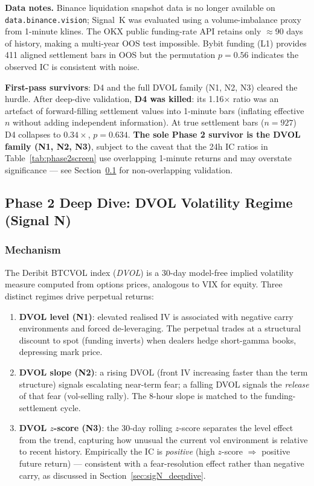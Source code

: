 \documentclass[12pt, a4paper]{article}
\theoremstyle{definition}
\begin{document}
\noindent \textbf{Data notes.}
Binance liquidation snapshot data is no longer available on
\texttt{data.binance.vision}; Signal~K was evaluated using a volume-imbalance
proxy from 1-minute klines.  The OKX public funding-rate API retains only
$\approx$90 days of history, making a multi-year OOS test impossible.
Bybit funding (L1) provides 411 aligned settlement bars in OOS but the
permutation $p = 0.56$ indicates the observed IC is consistent with noise.

\textbf{First-pass survivors}: D4 and the full DVOL family (N1, N2, N3)
cleared the hurdle.  After deep-dive validation, \textbf{D4 was killed}: its
1.16$\times$ ratio was an artefact of forward-filling settlement values into
1-minute bars (inflating effective $n$ without adding independent information).
At true settlement bars ($n = 927$) D4 collapses to $0.34\times$, $p = 0.634$.
\textbf{The sole Phase 2 survivor is the DVOL family (N1, N2, N3)}, subject to
the caveat that the 24h IC ratios in Table~\ref{tab:phase2screen} use overlapping
1-minute returns and may overstate significance --- see Section~\ref{sec:sigN}
for non-overlapping validation.

\subsection{Phase 2 Deep Dive: DVOL Volatility Regime (Signal N)}
\label{sec:sigN}

\subsubsection{Mechanism}

The Deribit BTCVOL index (\emph{DVOL}) is a 30-day model-free implied
volatility measure computed from options prices, analogous to VIX for equity.
Three distinct regimes drive perpetual returns:

\begin{enumerate}
  \item \textbf{DVOL level (N1)}: elevated realised IV is associated with
        negative carry environments and forced de-leveraging.  The perpetual
        trades at a structural discount to spot (funding inverts) when dealers
        hedge short-gamma books, depressing mark price.

  \item \textbf{DVOL slope (N2)}: a rising DVOL (front IV increasing faster
        than the term structure) signals escalating near-term fear; a falling
        DVOL signals the \emph{release} of that fear (vol-selling rally).
        The 8-hour slope is matched to the funding-settlement cycle.

  \item \textbf{DVOL $z$-score (N3)}: the 30-day rolling $z$-score separates
        the level effect from the trend, capturing how unusual the current
        vol environment is relative to recent history.  Empirically the IC
        is \emph{positive} (high $z$-score $\Rightarrow$ positive future
        return) --- consistent with a fear-resolution effect rather than
        negative carry, as discussed in Section~\ref{sec:sigN_deepdive}.
\end{enumerate}
\end{document}

